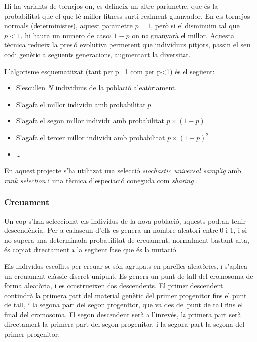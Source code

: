 \documentclass[titlepage,a4paper,12pt]{book}
\begin{document}
Hi ha variants de tornejos on, es defineix un altre paràmetre, que és la
probabilitat que el que té millor fitness surti realment guanyador.  En els
tornejos normals (deterministes), aquest parametre $p=1$, però si el disminuim
tal que $p<1$, hi haura un numero de casos $1-p$ on no guanyarà el millor.
Aquesta tècnica redueix la presió evolutiva permetent que individuus pitjors,
passin el seu codi genètic a següents generacions, augmentant la diversitat.

L'algorisme esquematitzat (tant per p=1 com per p<1) és el següent:

\begin{itemize}
	\item S'escullen $N$ individuus de la població aleatòriament.
	\item S'agafa el millor individu amb probabilitat $p$.
	\item S'agafa el segon millor individu amb probabilitat $p \times (1-p)$
	\item S'agafa el tercer millor individu amb probabilitat $p \times (1-p)^2$
	\item \ldots
\end{itemize}


En aquest projecte s'ha utilitzat una selecció \emph{stochastic
universal samplig} \cite{B87a} amb \emph{rank selection} \cite{B87b} i una
tècnica d'especiació coneguda com \emph{sharing} \cite{33}.

\subsubsection{Creuament}

Un cop s'han seleccionat els individus de la nova població, aquests podran tenir
descendència. Per a cadascun d'ells es genera un nombre aleatori entre 0 i 1, i
si no supera una determinada probabilitat de creuament, normalment bastant alta,
és copiat directament a la següent fase que és la mutació.

Els individus escollits per creuar-se són agrupats en parelles aleatòries, i
s'aplica un creuament clàssic discret unipunt.  Es genera un punt de tall del
cromosoma de forma aleatòria, i es construeixen dos descendents. El primer
descendent contindrà la primera part del material genètic del primer progenitor
fins el punt de tall, i la segona part del segon progenitor, que va des del punt
de tall fins el final del cromosoma. El segon descendent serà a l'inrevés, la
primera part serà directament la primera part del segon progenitor, i la segona
part la segona del primer progenitor.
\end{document}
